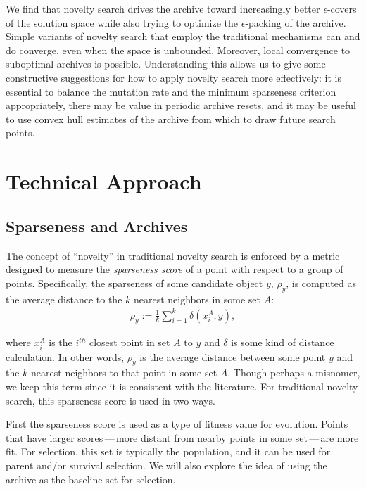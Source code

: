 \documentclass[twoside]{article}
\begin{document}
We find that novelty search drives the archive toward increasingly better $\epsilon$-covers of the solution space while also trying to optimize the $\epsilon$-packing of the archive.  Simple variants of novelty search that employ the traditional mechanisms can and do converge, even when the space is unbounded.  Moreover, local convergence to suboptimal archives is possible.  Understanding this allows us to give some constructive suggestions for how to apply novelty search more effectively: it is essential to balance the mutation rate and the minimum sparseness criterion appropriately, there may be value in periodic archive resets, and it may be useful to use convex hull estimates of the archive from which to draw future search points.



\section{Technical Approach}
\label{sec:approach}

\subsection{Sparseness and Archives}
\label{subsec:sparseness}

The concept of ``novelty'' in traditional novelty search is enforced by a metric designed to measure the \emph{sparseness score} of a point with respect to a group of points.  Specifically, the sparseness of some candidate object $y$, $\rho_y$, is computed as the average distance to the $k$ nearest neighbors in some set $A$:
%
\begin{eqnarray}
  \rho_y := \frac{1}{k} \sum_{i=1}^{k} \delta\left( x^A_i, y\right),
  \label{eqn:sparseness}
\end{eqnarray}

\noindent where $x^A_i$ is the $i^{th}$ closest point in set $A$ to $y$ and $\delta$ is some kind of distance calculation.  In other words, $\rho_y$ is the average distance between some point $y$ and the $k$ nearest neighbors to that point in some set $A$.  Though perhaps a misnomer, we keep this term since it is consistent with the literature.  For traditional novelty search, this sparseness score is used in two ways.  

First the sparseness score is used as a type of fitness value for evolution.  Points that have larger scores\,---\,more distant from nearby points in some set\,---\,are more fit.  For selection, this set is typically the population, and it can be used for parent and/or survival selection.  We will also explore the idea of using the archive as the baseline set for selection.
\end{document}
